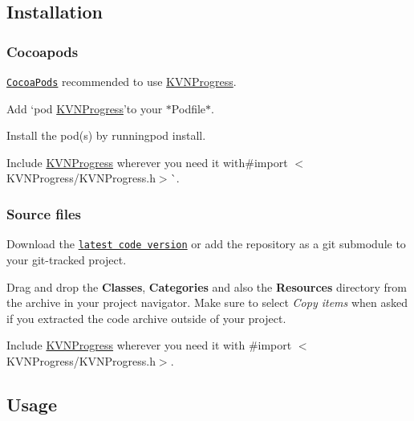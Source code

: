\href{https://www.youtube.com/watch?v=aerOmPYG_NI}{\tt }

\subsection*{Installation}

\subsubsection*{Cocoapods}

\href{http://www.cocoapods.org}{\tt Cocoa\+Pods} recommended to use \mbox{\hyperlink{interface_k_v_n_progress}{K\+V\+N\+Progress}}.


\begin{DoxyEnumerate}
\item Add `pod \textquotesingle{}\mbox{\hyperlink{interface_k_v_n_progress}{K\+V\+N\+Progress}}'{\ttfamily to your $\ast$\+Podfile$\ast$.}
\item {\ttfamily Install the pod(s) by running}pod install{\ttfamily .}
\item {\ttfamily Include \mbox{\hyperlink{interface_k_v_n_progress}{K\+V\+N\+Progress}} wherever you need it with}\#import $<$K\+V\+N\+Progress/\+K\+V\+N\+Progress.\+h$>$\`{}.
\end{DoxyEnumerate}

\subsubsection*{Source files}


\begin{DoxyEnumerate}
\item Download the \href{http://github.com/kevin-hirsch/KVNProgress/archive/master.zip}{\tt latest code version} or add the repository as a git submodule to your git-\/tracked project.
\item Drag and drop the {\bfseries Classes}, {\bfseries Categories} and also the {\bfseries Resources} directory from the archive in your project navigator. Make sure to select {\itshape Copy items} when asked if you extracted the code archive outside of your project.
\item Include \mbox{\hyperlink{interface_k_v_n_progress}{K\+V\+N\+Progress}} wherever you need it with {\ttfamily \#import $<$K\+V\+N\+Progress/\+K\+V\+N\+Progress.\+h$>$}.
\end{DoxyEnumerate}

\subsection*{Usage}

